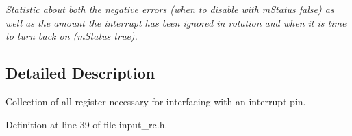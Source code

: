 \begin{DoxyCompactItemize}
\begin{DoxyCompactList}\small\item\em Statistic about both the negative errors (when to disable with m\+Status false) as well as the amount the interrupt has been ignored in rotation and when it is time to turn back on (m\+Status true). \end{DoxyCompactList}\end{DoxyCompactItemize}


\subsection{Detailed Description}
Collection of all register necessary for interfacing with an interrupt pin. 

Definition at line 39 of file input\+\_\+rc.\+h.

